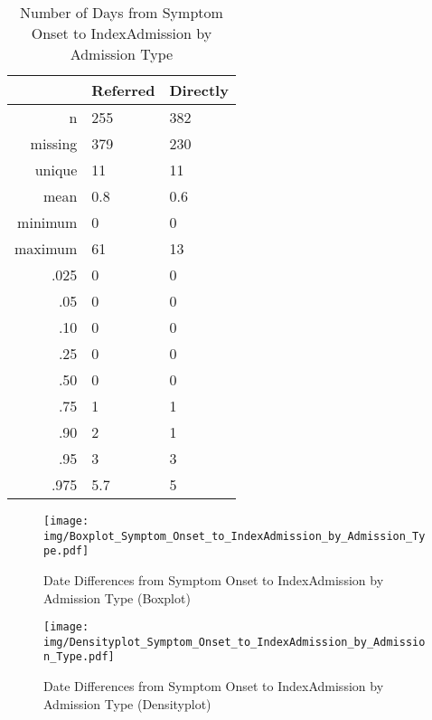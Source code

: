 \documentclass[a4paper]{report}
\begin{document}
\begin{itemize}
{%
\begin{table}[ht]
\centering
\begin{tabular}{rll}
  \toprule
 & Referred & Directly \\ 
  \midrule
n & 255 & 382 \\ 
  missing & 379 & 230 \\ 
  unique & 11 & 11 \\ 
  mean & 0.8 & 0.6 \\ 
  minimum & 0 & 0 \\ 
  maximum & 61 & 13 \\ 
  .025 & 0 & 0 \\ 
  .05 & 0 & 0 \\ 
  .10 & 0 & 0 \\ 
  .25 & 0 & 0 \\ 
  .50 & 0 & 0 \\ 
  .75 & 1 & 1 \\ 
  .90 & 2 & 1 \\ 
  .95 & 3 & 3 \\ 
  .975 & 5.7 & 5 \\ 
   \bottomrule
\end{tabular}
\caption{Number of Days from Symptom Onset to IndexAdmission by Admission Type} 
\end{table}
\begin{figure}
  \centering
  \caption{Date Differences from Symptom Onset to IndexAdmission by Admission Type (Boxplot)}
  \label{Boxplot: Date Differences from Symptom Onset to IndexAdmission by Admission Type}
\texttt{[image: img/Boxplot\_Symptom\_Onset\_to\_IndexAdmission\_by\_Admission\_Type.pdf]}\end{figure}


\begin{figure}
  \centering
  \caption{Date Differences from Symptom Onset to IndexAdmission by Admission Type (Densityplot)}
  \label{Density: Date Differences from Symptom Onset to IndexAdmission by Admission Type}
\texttt{[image: img/Densityplot\_Symptom\_Onset\_to\_IndexAdmission\_by\_Admission\_Type.pdf]}\end{figure}


\clearpage

}
\end{itemize}
\end{document}
